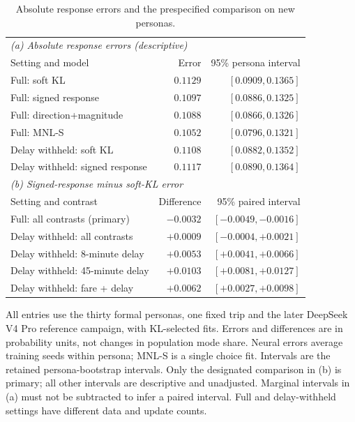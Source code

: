 \begin{table}[pos=htbp]\centering\small
\caption{Absolute response errors and the prespecified comparison on new personas.}
\label{tab:primary_results}
\setlength{\tabcolsep}{4pt}\renewcommand{\arraystretch}{1.12}
\begin{tabular*}{\linewidth}{@{\extracolsep{\fill}}lrr@{}}
\toprule
\multicolumn{3}{l}{\textit{(a) Absolute response errors (descriptive)}} \\
Setting and model & Error & 95\% persona interval \\
\midrule
Full: soft KL & $0.1129$ & $[0.0909,0.1365]$ \\
Full: signed response & $0.1097$ & $[0.0886,0.1325]$ \\
Full: direction+magnitude & $0.1088$ & $[0.0866,0.1326]$ \\
Full: MNL-S & $0.1052$ & $[0.0796,0.1321]$ \\
Delay withheld: soft KL & $0.1108$ & $[0.0882,0.1352]$ \\
Delay withheld: signed response & $0.1117$ & $[0.0890,0.1364]$ \\
\midrule
\multicolumn{3}{l}{\textit{(b) Signed-response minus soft-KL error}} \\
Setting and contrast & Difference & 95\% paired interval \\
\midrule
Full: all contrasts (primary) & $-0.0032$ & $[-0.0049,-0.0016]$ \\
Delay withheld: all contrasts & $+0.0009$ & $[-0.0004,+0.0021]$ \\
Delay withheld: 8-minute delay & $+0.0053$ & $[+0.0041,+0.0066]$ \\
Delay withheld: 45-minute delay & $+0.0103$ & $[+0.0081,+0.0127]$ \\
Delay withheld: fare + delay & $+0.0062$ & $[+0.0027,+0.0098]$ \\
\bottomrule\end{tabular*}
\par\smallskip\begin{minipage}{\linewidth}\footnotesize All entries use the thirty formal personas, one fixed trip and the later DeepSeek V4 Pro reference campaign, with KL-selected fits. Errors and differences are in probability units, not changes in population mode share. Neural errors average training seeds within persona; MNL-S is a single choice fit. Intervals are the retained persona-bootstrap intervals. Only the designated comparison in (b) is primary; all other intervals are descriptive and unadjusted. Marginal intervals in (a) must not be subtracted to infer a paired interval. Full and delay-withheld settings have different data and update counts.
\end{minipage}\end{table}
